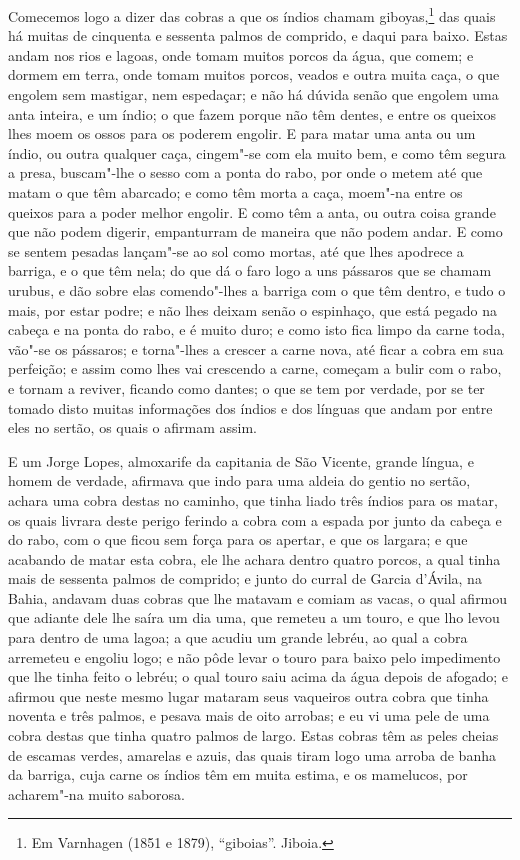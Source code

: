 Comecemos logo a dizer das cobras a que os índios chamam giboyas,\footnote{ Em Varnhagen
(1851 e 1879), ``giboias''. Jiboia.} das quais há muitas de cinquenta e sessenta palmos
de comprido, e daqui para baixo. Estas andam nos rios e lagoas, onde tomam muitos porcos
da água, que comem; e dormem em terra, onde tomam muitos porcos, veados e outra muita
caça, o que engolem sem mastigar, nem espedaçar; e não há dúvida senão que engolem uma
anta inteira, e um índio; o que fazem porque não têm dentes, e entre os queixos lhes moem
os ossos para os poderem engolir. E para matar uma anta ou um índio, ou outra qualquer
caça, cingem"-se com ela muito bem, e como têm segura a presa, buscam"-lhe o sesso com a
ponta do rabo, por onde o metem até que matam o que têm abarcado; e como têm morta a caça,
moem"-na entre os queixos para a poder melhor engolir. E como têm a anta, ou outra coisa
grande que não podem digerir, empanturram de maneira que não podem andar. E como se sentem
pesadas lançam"-se ao sol como mortas, até que lhes apodrece a barriga, e o que têm nela;
do que dá o faro logo a uns pássaros que se chamam urubus, e dão sobre elas comendo"-lhes a
barriga com o que têm dentro, e tudo o mais, por estar podre; e não lhes deixam senão o
espinhaço, que está pegado na cabeça e na ponta do rabo, e é muito duro; e como isto fica
limpo da carne toda, vão"-se os pássaros; e torna"-lhes a crescer a carne nova, até ficar a
cobra em sua perfeição; e assim como lhes vai crescendo a carne, começam a bulir com o
rabo, e tornam a reviver, ficando como dantes; o que se tem por verdade, por se ter tomado
disto muitas informações dos índios e dos línguas que andam por entre eles no sertão, os
quais o afirmam assim.

E um Jorge Lopes, almoxarife da capitania de São Vicente, grande língua, e homem de
verdade, afirmava que indo para uma aldeia do gentio no sertão, achara uma cobra destas no
caminho, que tinha liado três índios para os matar, os quais livrara deste perigo ferindo
a cobra com a espada por junto da cabeça e do rabo, com o que ficou sem força para os
apertar, e que os largara; e que acabando de matar esta cobra, ele lhe achara dentro
quatro porcos, a qual tinha mais de sessenta palmos de comprido; e junto do curral de
Garcia d'Ávila, na Bahia, andavam duas cobras que lhe matavam e comiam as vacas, o qual
afirmou que adiante dele lhe saíra um dia uma, que remeteu a um touro, e que lho levou
para dentro de uma lagoa; a que acudiu um grande lebréu, ao qual a cobra arremeteu e
engoliu logo; e não pôde levar o touro para baixo pelo impedimento que lhe tinha feito o
lebréu; o qual touro saiu acima da água depois de afogado; e afirmou que neste mesmo lugar
mataram seus vaqueiros outra cobra que tinha noventa e três palmos, e pesava mais de oito
arrobas; e eu vi uma pele de uma cobra destas que tinha quatro palmos de largo. Estas
cobras têm as peles cheias de escamas verdes, amarelas e azuis, das quais tiram logo uma
arroba de banha da barriga, cuja carne os índios têm em muita estima, e os mamelucos, por
acharem"-na muito saborosa.

